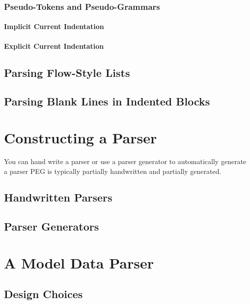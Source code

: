 \documentclass{book}
\begin{document}
\subsection{Pseudo-Tokens and Pseudo-Grammars}
\subsubsection{Implicit Current Indentation}
\subsubsection{Explicit Current Indentation}

\section{Parsing Flow-Style Lists}

\section{Parsing Blank Lines in Indented Blocks}



%
%
\chapter{Constructing a Parser}
You can hand write a parser or use a parser generator to automatically
generate a parser
PEG is typically partially handwritten and partially generated.

\section{Handwritten Parsers}

\section{Parser Generators}


%
%
\chapter{A Model Data Parser}

\section{Design Choices}
\end{document}
